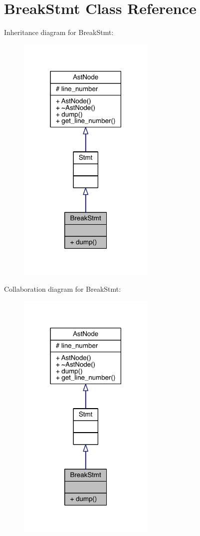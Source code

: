 \hypertarget{class_break_stmt}{}\section{Break\+Stmt Class Reference}
\label{class_break_stmt}


Inheritance diagram for Break\+Stmt\+:\nopagebreak
\begin{figure}[H]
\begin{center}
\leavevmode
\includegraphics[width=186pt]{class_break_stmt__inherit__graph}
\end{center}
\end{figure}


Collaboration diagram for Break\+Stmt\+:\nopagebreak
\begin{figure}[H]
\begin{center}
\leavevmode
\includegraphics[width=186pt]{class_break_stmt__coll__graph}
\end{center}
\end{figure}
